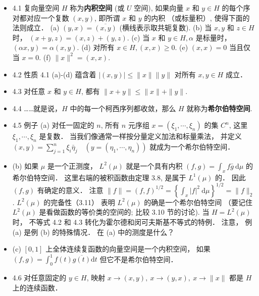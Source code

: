 \begin{itemize}
\item 4.1 复向量空间 $H$ 称为\textbf{内积空间} (或 $U$ 空间), 如果向量 $x$ 和 $y \in H$ 的每个序对都对应一个复数 $(x, y)$, 即所谓 $x$ 和 $y$ 的内积 （或标量积）, 使得下面的法则成立． (a) $(y, x)=\overline{(x, y)}$ (横线表示取共轭复数). (b) 当 $x, y$ 和 $z \in H$ 时， $(x+y, z)=(x, z)+(y, z)$. (c) 当 $x$ 和 $y \in H, \alpha$ 是标量时， $(\alpha x, y)=\alpha(x, y)$. (d) 对所有 $x \in H,(x, x) \geqslant 0$. (e) $(x, x)=0$ 当且仅当 $x=0$. (f) $\|x\|^{2}=(x, x)$.

\item 4.2 性质 4.1 (a)-(d) 蕴含着 $|(x, y)| \leqslant\|x\|\|y\|$ 对所有 $x, y \in H$ 成立．

\item 4.3 对任意 $x$ 和 $y \in H$, 都有 $\|x+y\| \leqslant\|x\|+\|y\|$.

\item 4.4 ……就是说，$H$ 中的每一个柯西序列都收敛，那么 $H$ 就称为\textbf{希尔伯特空间}.

\item 4.5 例子 (a) 对任一固定的 $n$, 所有 $n$ 元序组 $x=\left(\xi_{1}, \cdots, \xi_{n}\right)$ 的集 $C^{n}$, 这里 $\xi_{1}, \cdots, \xi_{n}$ 是复数． 当我们像通常一样按分量定义加法和标量乘法， 并定义 $(x, y)=\sum_{j=1}^{n} \xi_{i} \bar{\eta}_{j} \quad\left(y=\left(\eta_{1}, \cdots, \eta_{n}\right)\right)$ 就成为一个希尔伯特空间．

\item (b) 如果 $\mu$ 是一个正测度， $L^{2}(\mu)$ 就是一个具有内积 $(f, g)=\int_{x} f \bar{g} \mathrm{~d} \mu$ 的希尔伯特空间． 这里右端的被积函数由定理 3.8, 是属于 $L^1(\mu)$ 的． 因此 $(f, g)$ 有确定的意义． 注意 $\|f\|=(f, f)^{1 / 2}=\left\{\int_{x}|f|^{2} \mathrm{~d} \mu\right\}^{1 / 2}=\|f\|_{2}$. $L^{2}(\mu)$ 的完备性（3.11） 表明 $L^{2}(\mu)$ 的确是一个希尔伯特空间 （要记住 $L^{2}(\mu)$ 是看做函数的等价类的空间的; 比较 3.10 节的讨论). 当 $H=L^{2}(\mu)$ 时， 不等式 4.2 和 4.3 转化为霍尔德和闵可夫斯基不等式的特例． 注意， 例 (a) 是例 (b) 的特殊情况． 在 (a) 中的测度是什么？

\item (c) $[0,1]$ 上全体连续复函数的向量空间是一个内积空间， 如果 $(f, g)=\int_{0}^{1} f(t) \overline{g(t)} \mathrm{d} t$ 但它不是希尔伯特空间．

\item 4.6 对任意固定的 $y \in H$, 映射 $x \rightarrow(x, y),\ x \rightarrow(y, x),\ x \rightarrow\|x\|$ 都是 $H$ 上的连续函数．


\end{itemize}
